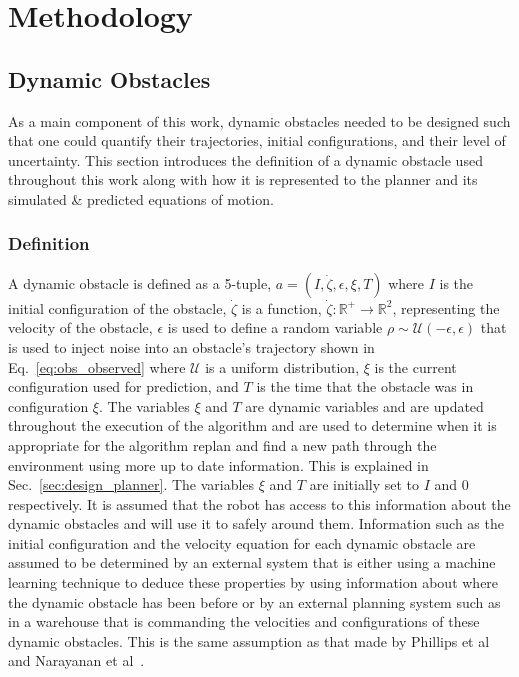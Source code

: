 


\chapter{Methodology}

\label{chapter:methodology}

\section{Dynamic Obstacles}

As a main component of this work, dynamic obstacles needed to be designed such
that one could quantify their trajectories, initial configurations, and their
level of uncertainty. This section introduces the definition of a dynamic
obstacle used throughout this work along with how it is represented to the
planner and its simulated \& predicted equations of motion.

\subsection{Definition}

\label{sec:def}

A dynamic obstacle is defined as a 5-tuple, $a = (I, \dot{\zeta},
\epsilon, \xi, T)$ where $I$ is the initial configuration of the obstacle,
$\dot{\zeta}$ is a function, $\dot{\zeta}: \mathbb{R}^+ \rightarrow
\mathbb{R}^2$, representing the velocity of the obstacle, $\epsilon$ is used to
define a random variable $\rho \sim \mathcal{U}(-\epsilon, \epsilon)$ that is
used to inject noise into an obstacle's trajectory shown in
Eq.~\ref{eq:obs_observed} where $\mathcal{U}$ is a uniform distribution, $\xi$
is the current configuration used for prediction, and $T$ is the time that the
obstacle was in configuration $\xi$.  The variables $\xi$ and $T$ are dynamic
variables and are updated throughout the execution of the algorithm and are
used to determine when it is appropriate for the algorithm replan and find a
new path through the environment using more up to date information. This is
explained in Sec.~\ref{sec:design_planner}. The variables $\xi$ and $T$ are
initially set to $I$ and $0$ respectively. It is assumed that the robot has
access to this information about the dynamic obstacles and will use it to
safely around them.  Information such as the initial configuration and the
velocity equation for each dynamic obstacle are assumed to be determined by an
external system that is either using a machine learning technique to deduce
these properties by using information about where the dynamic obstacle has been
before or by an external planning system such as in a warehouse that is
commanding the velocities and configurations of these dynamic obstacles. This
is the same assumption as that made by Phillips et al~\cite{sipp} and Narayanan
et al~\cite{asipp}.

